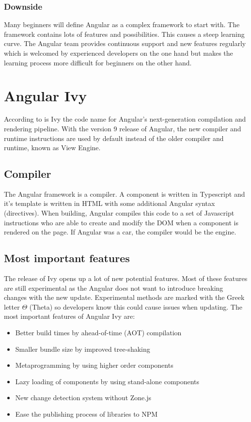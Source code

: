 \subsubsection{Downside}
Many beginners will define Angular as a complex framework to start with. The framework contains lots of features and possibilities. This causes a steep learning curve. The Angular team provides continuous support and new features regularly which is welcomed by experienced developers on the one hand but makes the learning process more difficult for beginners on the other hand.
\autocite{AltexSoft}

\section{Angular Ivy}
According to \textcite{Angular.io-ivy} is Ivy the code name for Angular's next-generation compilation and rendering pipeline. With the version 9 release of Angular, the new compiler and runtime instructions are used by default instead of the older compiler and runtime, known as View Engine.

\subsection{Compiler}
The Angular framework is a compiler. A component is written in Typescript and it's template is written in HTML with some additional Angular syntax (directives). When building, Angular compiles this code to a set of Javascript instructions who are able to create and modify the DOM when a component is rendered on the page. If Angular was a car, the compiler would be the engine.

\subsection{Most important features}
The release of Ivy opens up a lot of new potential features. Most of these features are still experimental as the Angular does not want to introduce breaking changes with the new update. Experimental methods are marked with the Greek letter \(\Theta\) (Theta) so developers know this could cause issues when updating. The most important features of Angular Ivy are:
\begin{itemize}
    \item Better build times by ahead-of-time (AOT) compilation
    \item Smaller bundle size by improved tree-shaking
    \item Metaprogramming by using higher order components \autocite{Savkin2018}
    \item Lazy loading of components by using stand-alone components
    \item New change detection system without Zone.js
    \item Ease the publishing process of libraries to NPM
\end{itemize}

